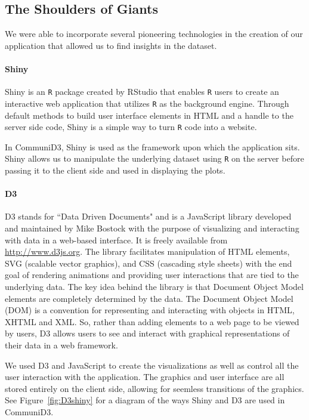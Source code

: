 \documentclass[11pt]{article}\usepackage{knitr}
\begin{document}
\subsection*{The Shoulders of Giants}
We were able to incorporate several pioneering technologies in the creation of our application that allowed us to find insights in the dataset.

\paragraph{Shiny}
Shiny \cite{rs-shiny} is an {\tt R} package created by RStudio that enables {\tt R} users to create an interactive web application that utilizes {\tt R} as the background engine. Through default methods to build user interface elements in HTML and a handle to the server side code, Shiny is a simple way to turn {\tt R} code into a website. 

In CommuniD3, Shiny is used as the framework upon which the application sits. Shiny allows us to manipulate the underlying dataset using {\tt R} on the server before passing it to the client side and used in displaying the plots.

\paragraph{D3}
D3 \cite{mb-d3} stands for ``Data Driven Documents" and is a JavaScript library developed and maintained by Mike Bostock with the  purpose of visualizing and interacting with data in a web-based interface. It is freely available from \url{http://www.d3js.org}. The library facilitates manipulation of HTML elements, SVG (scalable vector graphics), and CSS (cascading style sheets) with the end goal of rendering animations and providing user interactions that are tied to the underlying data. The key idea behind the library is that Document Object Model elements are completely determined by the data. The Document Object Model (DOM) is a convention for representing and interacting with objects in HTML, XHTML and XML. So, rather than adding elements to a web page to be viewed by users, D3 allows users to see and interact with graphical representations of their data in a web framework. 

We used D3 and JavaScript to create the visualizations as well as control all the user interaction with the application. The graphics and user interface are all stored entirely on the client side, allowing for seemless transitions of the graphics. See Figure~\ref{fig:D3shiny} for a diagram of the ways Shiny and D3 are used in CommuniD3.
\end{document}
